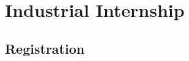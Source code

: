 \documentclass[../00_main.tex]{subfiles}
\begin{document}
\section{Industrial Internship}

\subsection{Registration}
\end{document}
